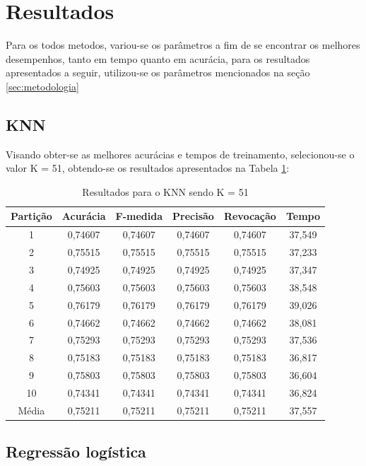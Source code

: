 \section{Resultados}

Para os todos metodos, variou-se os parâmetros a fim de se encontrar os melhores desempenhos, tanto em tempo quanto em acurácia, para os resultados apresentados a seguir, utilizou-se os parâmetros mencionados na seção \ref{sec:metodologia}

\subsection{KNN}

Visando obter-se as melhores acurácias e tempos de treinamento, selecionou-se o valor K = 51, obtendo-se os resultados apresentados na Tabela \ref{table:resultadosKNN}:

\begin{table}[h]
\centering
\caption{Resultados para o KNN sendo K = 51}
\vspace{0.2cm}
\begin{tabular}{c|c|c|c|c|c}
Partição & Acurácia & F-medida & Precisão & Revocação & Tempo \\
\hline
1  & 0,74607 & 0,74607 & 0,74607 & 0,74607 & 37,549 \\
2  & 0,75515 & 0,75515 & 0,75515 & 0,75515 & 37,233 \\
3  & 0,74925 & 0,74925 & 0,74925 & 0,74925 & 37,347 \\
4  & 0,75603 & 0,75603 & 0,75603 & 0,75603 & 38,548 \\
5  & 0,76179 & 0,76179 & 0,76179 & 0,76179 & 39,026 \\
6  & 0,74662 & 0,74662 & 0,74662 & 0,74662 & 38,081 \\
7  & 0,75293 & 0,75293 & 0,75293 & 0,75293 & 37,536 \\
8  & 0,75183 & 0,75183 & 0,75183 & 0,75183 & 36,817 \\
9  & 0,75803 & 0,75803 & 0,75803 & 0,75803 & 36,604 \\
10 & 0,74341 & 0,74341 & 0,74341 & 0,74341 & 36,824 \\
\hline
Média & 0,75211 & 0,75211 & 0,75211 & 0,75211 & 37,557

\end{tabular} 
\label{table:resultadosKNN}
\end{table}

\subsection{Regressão logística}

